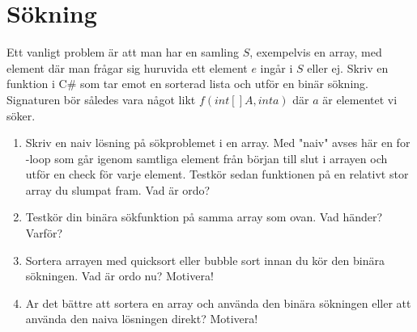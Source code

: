 \documentclass{article}
\begin{document}
\section*{Sökning}
Ett vanligt problem är att man har en samling $S$, exempelvis en array, med element där man
frågar sig huruvida ett element $e$ ingår i $S$ eller ej. Skriv en funktion i C\# som tar emot en sorterad lista och utför en binär sökning. Signaturen bör således vara något likt $f(int[ ] A, int a) $ där $a$ är elementet vi söker.
\begin{enumerate}
\item Skriv en naiv lösning på sökproblemet i en array. Med "naiv" avses här en for -loop
som går igenom samtliga element från början till slut i arrayen och utför en check för
varje element. Testkör sedan funktionen på en relativt stor array du slumpat fram. Vad
är ordo?
\item Testkör din binära sökfunktion på samma array som ovan. Vad händer? Varför?
\item Sortera arrayen med quicksort eller bubble sort innan du kör den binära sökningen.
Vad är ordo nu? Motivera!
\item Ar det bättre att sortera en array och använda den binära sökningen eller att använda
den naiva lösningen direkt? Motivera!
\end{enumerate}
\end{document}
